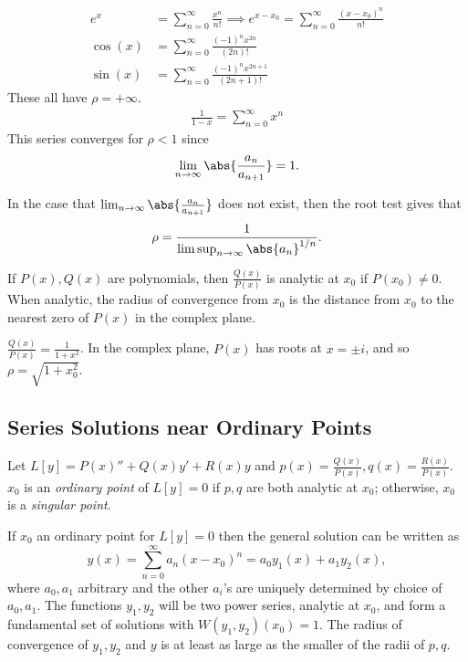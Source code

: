 \begin{example}
    \begin{align*}
        e^x &= \sum_{n=0}^\infty \frac{x^n}{n!} \implies e^{x - x_0} = \sum_{n=0}^\infty \frac{(x-x_0)^n}{n!}\\
        \cos(x) &= \sum_{n=0}^\infty \frac{(-1)^nx^{2n}}{(2n)!}\\
        \sin(x) &= \sum_{n=0}^\infty \frac{(-1)^n x^{2n+1}}{(2n+1)!}
    \end{align*}
    These all have $\rho = + \infty$.
    \begin{align*}
        \frac{1}{1-x} = \sum_{n = 0}^\infty x^n
    \end{align*}
    This series converges for $\rho < 1$ since \[
    \lim_{n \to \infty}  \abs{\frac{a_{n}}{a_{n+1}}} = 1.
    \]
\end{example}
\begin{remark}
In the case that $\lim_{n \to \infty} \abs{\frac{a_n}{a_{n+1}}}$ does not exist, then the root test gives that \[
\rho = \frac{1}{\limsup_{n \to \infty} \abs{a_n}^{1/n}}.
\]
\end{remark}

\begin{proposition}
    If $P(x), Q(x)$ are polynomials, then $\frac{Q(x)}{P(x)}$ is analytic at $x_0$ if $P(x_0) \neq 0$. When analytic, the radius of convergence from $x_0$ is the distance from $x_0$ to the nearest zero of $P(x)$ in the complex plane.
\end{proposition}
\begin{example}
    $\frac{Q(x)}{P(x)} = \frac{1}{1 + x^2}$. In the complex plane, $P(x)$ has roots at $x = \pm i$, and so $\rho = \sqrt{1 + x_0^2}$.
\end{example}

\subsection{Series Solutions near Ordinary Points}

\begin{definition}
    Let $L[y] = P(x)'' + Q(x)y' + R(x)y$ and $p(x) = \frac{Q(x)}{P(x)}, q(x) = \frac{R(x)}{P(x)}$. $x_0$ is an \emph{ordinary point} of $L[y] = 0$ if $p, q$ are both analytic at $x_0$; otherwise, $x_0$ is a \emph{singular point}.
\end{definition}

\begin{theorem}
    If $x_0$ an ordinary point for $L[y]=0$ then the general solution can be written as \[
    y(x) = \sum_{n=0}^\infty a_n(x-x_0)^n = a_0y_1(x) + a_1 y_2(x),
    \]
    where $a_0, a_1$ arbitrary and the other $a_i$'s are uniquely determined by choice of $a_0, a_1$. The functions $y_1, y_2$ will be two power series, analytic at $x_0$, and form a fundamental set of solutions with $W(y_1, y_2)(x_0) = 1$. The radius of convergence of $y_1, y_2$ and $y$ is at least as large as the smaller of the radii of $p, q$.
\end{theorem}

